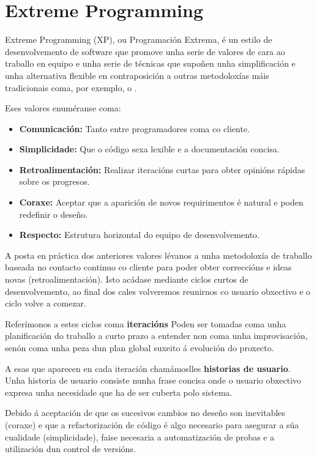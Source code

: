 \section{Extreme Programming}

Extreme Programming (XP), ou Programación Extrema, é un estilo de desenvolvemento de software que promove unha serie de valores de cara ao traballo en equipo e unha serie de técnicas que supoñen unha simplificación e unha alternativa flexible en contraposición a outras metodoloxías máis tradicionais coma, por exemplo, o .

Eses valores enuméranse coma\cite{xp}: 

\begin{itemize}
	\item \textbf{Comunicación:} Tanto entre programadores coma co cliente.
	\item \textbf{Simplicidade:} Que o código sexa lexible e a documentación concisa.
	\item \textbf{Retroalimentación:} Realizar iteracións curtas para obter opinións rápidas sobre os progresos.
	\item \textbf{Coraxe:} Aceptar que a aparición de novos requirimentos é natural e poden redefinir o deseño.
	\item \textbf{Respecto:} Estrutura horizontal do equipo de desenvolvemento.
\end{itemize}


A posta en práctica dos anteriores valores lévanos a unha metodoloxía de traballo baseada no contacto continuo co cliente para poder obter correccións e ideas novas (retroalimentación). Isto acádase mediante ciclos curtos de desenvolvemento, ao final dos cales volveremos reunirnos co usuario obxectivo e o ciclo volve a comezar. 

Referímonos a estes ciclos coma \textbf{iteracións} Poden ser tomadas coma unha planificación do traballo a curto prazo a entender non coma unha improvisación, senón coma unha peza dun plan global suxeito á evolución do proxecto. 

A esas  que aparecen en cada iteración  chamámoslles \textbf{historias de usuario}. Unha historia de usuario consiste nunha frase concisa onde o usuario obxectivo expresa unha necesidade que ha de ser cuberta polo sistema.

Debido á aceptación de que os sucesivos cambios no deseño son inevitables (coraxe) e que a refactorización de código é algo necesario para asegurar a súa cualidade (simplicidade), faise necesaria a automatización de probas e a utilización dun control de versións.

